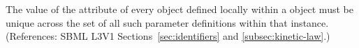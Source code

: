 The value of the  attribute of every \LocalParameter object
defined locally within a \KineticLaw object must be unique across the set
of all such parameter definitions within that \KineticLaw instance.
(References: SBML L3V1 Sections~\ref{sec:identifiers} and
\ref{subsec:kinetic-law}.)
